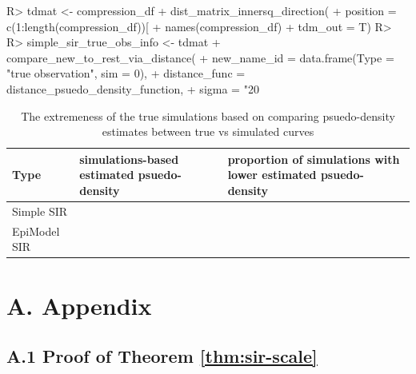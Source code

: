 \documentclass[
  shortnames]{jss}
\begin{document}
\begin{CodeChunk}
\begin{CodeInput}
R> tdmat <- compression_df %
+   dist_matrix_innersq_direction(
+     position = c(1:length(compression_df))[
+       names(compression_df) %
+     tdm_out = T)
R> 
R> simple_sir_true_obs_info <- tdmat %
+   compare_new_to_rest_via_distance(
+     new_name_id = data.frame(Type = "true observation", sim = 0),
+     distance_func = distance_psuedo_density_function, 
+     sigma = "20%
\end{CodeInput}
\end{CodeChunk}

\begin{CodeChunk}
\begin{table}[!h]

\caption{\label{tab:hags-extreme}The extremeness of the true simulations based on comparing psuedo-density estimates between true vs simulated curves}
\centering
\begin{tabular}[t]{l>{\raggedleft\arraybackslash}p{6cm}>{\raggedleft\arraybackslash}p{6cm}}
\toprule
Type & simulations-based estimated psuedo-density & proportion of simulations with lower estimated psuedo-density\\
\midrule
Simple SIR & 0.0036733 & 0\\
EpiModel SIR & 0.0028813 & 0\\
\bottomrule
\end{tabular}
\end{table}

\end{CodeChunk}

\hypertarget{a.-appendix}{%
\section*{A. Appendix}\label{a.-appendix}}

\hypertarget{a.1-proof-of-theorem}{%
\subsection*{\texorpdfstring{A.1 Proof of Theorem
\ref{thm:sir-scale}}{A.1 Proof of Theorem }}\label{a.1-proof-of-theorem}}
\end{document}

